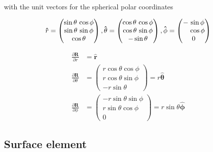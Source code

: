 with the unit vectors for the spherical polar coordinates 

\begin{equation}%
   \mathbf{\hat{\text{$r$}}} = \begin{pmatrix}
  \sin\theta \, \cos\phi \\
 \sin\theta \, \sin\phi \\
 \cos\theta
\end{pmatrix},
\mathbf{\hat{\text{$\theta$}}} = \begin{pmatrix}
  \cos\theta \, \cos\phi \\
  \cos\theta \, \sin\phi \\
 - \sin\theta
\end{pmatrix},
\mathbf{\hat{\text{$\phi$}}} = \begin{pmatrix}
  - \, \sin\phi \\
 \hphantom{-} \, \cos\phi \\
 0
\end{pmatrix}
\end{equation}%

\begin{equation}%
\begin{aligned}
    \frac{\partial\mathbf{R}}{\partial r} &= \mathbf{\hat{\text{$r$}}}\\ 
    \frac{\partial\mathbf{R}}{\partial \theta} &= \begin{pmatrix}
 r \cos\theta  \cos\phi \\
 r \cos\theta  \sin\phi \\
 -r \sin\theta
\end{pmatrix} =r\mathbf{\hat{\text{$\theta$}}} \\
    \frac{\partial\mathbf{R}}{\partial \phi} &= \begin{pmatrix}
 -r \sin\theta  \sin\phi \\
 r \sin\theta  \cos\phi \\
 0
\end{pmatrix} = r \sin\theta \mathbf{\hat{\text{$\phi$}}} 
\end{aligned}
\end{equation}%





\subsection{Surface element}


